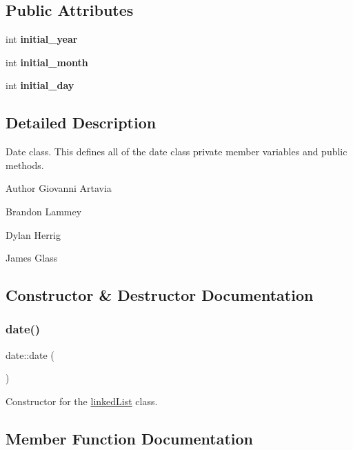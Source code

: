 \subsection*{Public Attributes}
\begin{DoxyCompactItemize}
\item 
\mbox{\label{classdate_af1538257d381447423df5538a80c0f55}} 
int {\bfseries initial\+\_\+year}
\item 
\mbox{\label{classdate_a92e9a09cec16184c393dd24dacb18dc4}} 
int {\bfseries initial\+\_\+month}
\item 
\mbox{\label{classdate_a316254c9dc377154aa3a565c7fc10a5c}} 
int {\bfseries initial\+\_\+day}
\end{DoxyCompactItemize}


\subsection{Detailed Description}
Date class. This defines all of the date class\textquotesingle{} private member variables and public methods. \begin{DoxyAuthor}{Author}
Giovanni Artavia 

Brandon Lammey 

Dylan Herrig 

James Glass 
\end{DoxyAuthor}


\subsection{Constructor \& Destructor Documentation}
\mbox{\label{classdate_ace1e9bd1562330f4d03a385ee0cc2eba}} 
\subsubsection{\texorpdfstring{date()}{date()}}
{\footnotesize\ttfamily date\+::date (\begin{DoxyParamCaption}{ }\end{DoxyParamCaption})}

Constructor for the \hyperlink{classlinked_list}{linked\+List} class. 

\subsection{Member Function Documentation}
\mbox{\label{classdate_adf8c535b09b2adadcfb27e49de6b588e}} 
